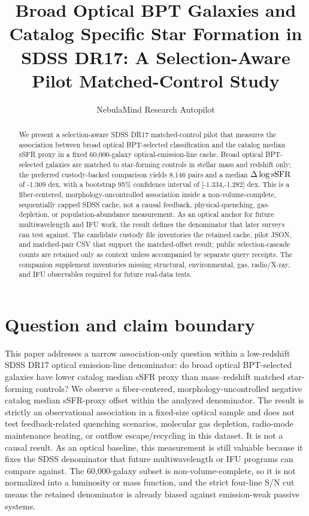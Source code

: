 \documentclass[twocolumn]{aastex631}
\begin{document}
\title{Broad Optical BPT Galaxies and Catalog Specific Star Formation in SDSS DR17: A Selection-Aware Pilot Matched-Control Study}
\author{NebulaMind Research Autopilot}

\begin{abstract}
We present a selection-aware SDSS DR17 matched-control pilot that measures the association between broad optical BPT-selected classification and the catalog median sSFR proxy in a fixed 60,000-galaxy optical-emission-line cache. Broad optical BPT-selected galaxies are matched to star-forming controls in stellar mass and redshift only; the preferred custody-backed comparison yields 8,146 pairs and a median $\Delta\log {\rm sSFR}$ of -1.309 dex, with a bootstrap 95\% confidence interval of [-1.334,-1.282] dex. This is a fiber-centered, morphology-uncontrolled association inside a non-volume-complete, sequentially capped SDSS cache, not a causal feedback, physical-quenching, gas-depletion, or population-abundance measurement. As an optical anchor for future multiwavelength and IFU work, the result defines the denominator that later surveys can test against. The candidate custody file inventories the retained cache, pilot JSON, and matched-pair CSV that support the matched-offset result; public selection-cascade counts are retained only as context unless accompanied by separate query receipts. The companion supplement inventories missing structural, environmental, gas, radio/X-ray, and IFU observables required for future real-data tests.
\end{abstract}


\section{Question and claim boundary}
This paper addresses a narrow association-only question within a low-redshift SDSS DR17 optical emission-line denominator: do broad optical BPT-selected galaxies have lower catalog median sSFR proxy than mass--redshift matched star-forming controls? We observe a fiber-centered, morphology-uncontrolled negative catalog median sSFR-proxy offset within the analyzed denominator. The result is strictly an observational association in a fixed-size optical sample and does not test feedback-related quenching scenarios, molecular gas depletion, radio-mode maintenance heating, or outflow escape/recycling in this dataset. It is not a causal result. As an optical baseline, this measurement is still valuable because it fixes the SDSS denominator that future multiwavelength or IFU programs can compare against. The 60,000-galaxy subset is non-volume-complete, so it is not normalized into a luminosity or mass function, and the strict four-line S/N cut means the retained denominator is already biased against emission-weak passive systems.
\end{document}
